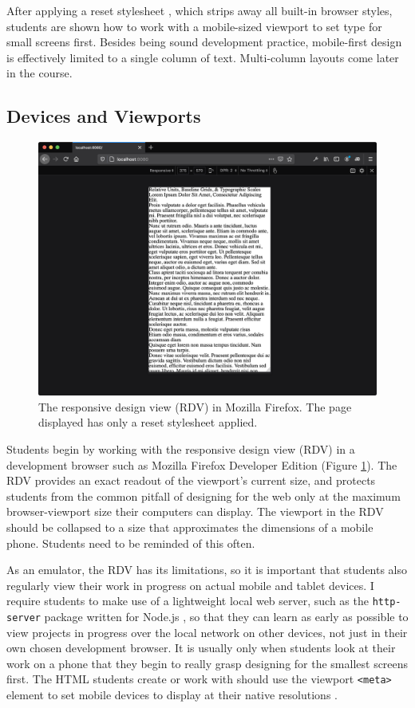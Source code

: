 \documentclass[sigplan,screen]{acmart}
\begin{document}
 After applying a reset stylesheet \cite{em:rc}, which strips away all built-in browser styles, students are shown how to work with a mobile-sized viewport to set type for small screens first. Besides being sound development practice, mobile-first design is effectively limited to a single column of text. Multi-column layouts come later in the course.

\subsection{Devices and Viewports}

\begin{figure}
  \includegraphics[width=\linewidth]{rdv}
  \caption{The responsive design view (RDV) in Mozilla Firefox. The  page displayed has only a reset stylesheet applied.}
  \label{fig:rdv}
\end{figure}

Students begin by working with the responsive design view (RDV) in a development browser such as Mozilla Firefox Developer Edition (Figure \ref{fig:rdv}). The RDV provides an exact readout of the viewport's current size, and protects students from the common pitfall of designing for the web only at the maximum browser-viewport size their computers can display. The viewport in the RDV should be collapsed to a size that approximates the dimensions of a mobile phone. Students need to be reminded of this often.

As an emulator, the RDV has its limitations, so it is important that students also regularly view their work in progress on actual mobile and tablet devices. I require students to make use of a lightweight local web server, such as the \verb|http-server| package written for Node.js \cite{npm:http}, so that they can learn as early as possible to view projects in progress over the local network on other devices, not just in their own chosen development browser. It is usually only when students look at their work on a phone that they begin to really grasp designing for the smallest screens first. The HTML students create or work with should use the viewport \verb|<meta>| element to set mobile devices to display at their native resolutions \cite{mdn:mvp}.
\end{document}
